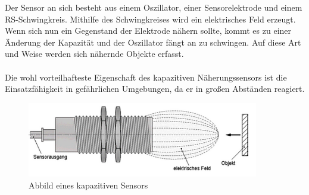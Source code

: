 \documentclass[11pt, a4paper]{article}
\begin{document}
Der Sensor an sich besteht aus einem Oszillator, einer Sensorelektrode und einem RS-Schwingkreis. Mithilfe des Schwingkreises wird ein elektrisches Feld erzeugt. Wenn sich nun ein Gegenstand der Elektrode n\"ahern sollte, kommt es zu einer \"Anderung der Kapazit\"at und der Oszillator f\"angt an zu schwingen. Auf diese Art und Weise werden sich n\"ahernde Objekte erfasst.\\\\

Die wohl vorteilhafteste Eigenschaft des kapazitiven N\"aherungssensors ist die Einsatzf\"ahigkeit in gef\"ahrlichen Umgebungen, da er in gro\ss{}en Abst\"anden reagiert.
\begin{figure}[h!]
		\centering
		\includegraphics[width=0.9\textwidth]{graphics/sensors/kapazitiv-sensor}
		\caption{Abbild eines kapazitiven Sensors\cite{kapazitiv-sensor}}
\end{figure}


\newpage
\newpage
\nocite{*}

{}
\end{document}
